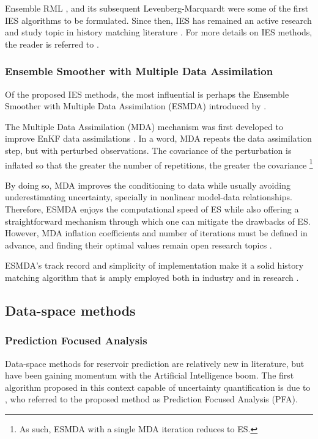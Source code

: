 Ensemble RML \cite{Chen:2012}, 
and its subsequent Levenberg-Marquardt \cite{Chen:2013}
were some of the first IES algorithms to be formulated.
%
Since then, IES has remained an active research and study topic in history matching literature
\cite{Luo:2015, Zhang:2018, Raanes:2019, Maschio:2024}.
For more details on IES methods, the reader is referred to 
.

\subsubsection{Ensemble Smoother with Multiple Data Assimilation}

Of the proposed IES methods, the most influential is perhaps the 
Ensemble Smoother with Multiple Data Assimilation (ESMDA) 
introduced by .

The Multiple Data Assimilation (MDA) mechanism was 
first developed to improve EnKF data assimilations
\cite{Emerick:2012}.
%
In a word, MDA repeats the data assimilation step, but with perturbed observations.
The covariance of the perturbation is inflated so that the greater the number of repetitions,
the greater the covariance%
\footnote{%
    As such, ESMDA with a single MDA iteration reduces to ES.
}

By doing so, MDA improves the conditioning to data while usually avoiding underestimating uncertainty,
specially in nonlinear model-data relationships.
%
Therefore, ESMDA enjoys the computational speed of ES while also offering a 
straightforward mechanism through which one can mitigate the drawbacks of ES.
%
However, MDA inflation coefficients and number of iterations must be defined in advance,
and finding their optimal values remain open research topics
\cite[subsection 5.3.5]{Emerick:2025}.

ESMDA's track record and simplicity of implementation make it
a solid history matching algorithm that is 
amply employed both in industry and in research
\cite{Grana:2019, Neto:2021, Tao:2025}.

\subsection{Data-space methods}
\label{subsec:data-space-methods} 

\subsubsection{Prediction Focused Analysis}
    Data-space methods for reservoir prediction are relatively new in literature, 
    but have been gaining momentum with the Artificial Intelligence boom.
    The first algorithm proposed in this context capable of uncertainty quantification
    is due to ,
    who referred to the proposed method as Prediction Focused Analysis (PFA).
    
